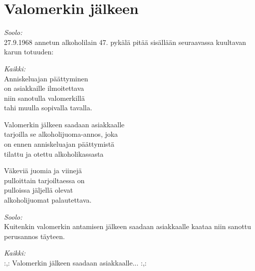 \section{Valomerkin jälkeen}
\vspace*{-0.15cm}
\textit{Soolo:}\\
27.9.1968 annetun alkoholilain 47. pykälä pitää sisällään seuraavassa kuultavan karun totuuden:

\textit{Kaikki:}\\
Anniskeluajan päättyminen\\
on asiakkaille ilmoitettava\\
niin sanotulla valomerkillä\\
tahi muulla sopivalla tavalla.

Valomerkin jälkeen saadaan asiakkaalle\\
tarjoilla se alkoholijuoma-annos, joka\\
on ennen anniskeluajan päättymistä\\
tilattu ja otettu alkoholikassasta

Väkeviä juomia ja viinejä\\
pulloittain tarjoiltaessa on\\
pulloissa jäljellä olevat\\
alkoholijuomat palautettava.

\textit{Soolo:}\\
Kuitenkin valomerkin antamisen jälkeen saadaan asiakkaalle
kaataa niin sanottu perusannos täyteen.

\textit{Kaikki:}\\
:,: Valomerkin jälkeen saadaan asiakkaalle... :,: